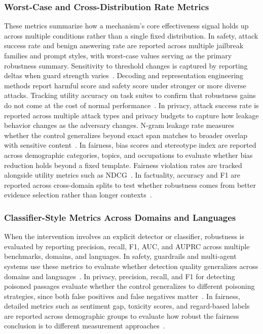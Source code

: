 \subsubsection{Worst-Case and Cross-Distribution Rate Metrics}
These metrics summarize how a mechanism's core effectiveness signal holds up across multiple conditions rather than a single fixed distribution. In safety, attack success rate and benign answering rate are reported across multiple jailbreak families and prompt styles, with worst-case values serving as the primary robustness summary. Sensitivity to threshold changes is captured by reporting deltas when guard strength varies~\citep{kumar2024certifying, cao2024defending, zhou2024defending}. Decoding and representation engineering methods report harmful score and safety score under stronger or more diverse attacks. Tracking utility accuracy on task suites to confirm that robustness gains do not come at the cost of normal performance~\citep{Xu2024SafeDecodingDA, Wang2024InferAligner, deng2025guard}. In privacy, attack success rate is reported across multiple attack types and privacy budgets to capture how leakage behavior changes as the adversary changes. N-gram leakage rate measures whether the control generalizes beyond exact span matches to broader overlap with sensitive content~\citep{tong2025inferdpt, chaudhari2024phantom}. In fairness, bias scores and stereotype index are reported across demographic categories, topics, and occupations to evaluate whether bias reduction holds beyond a fixed template. Fairness violation rates are tracked alongside utility metrics such as NDCG~\citep{kamruzzaman2024prompting, dwivedi2023breaking, huang2024bias}. In factuality, accuracy and F1 are reported across cross-domain splits to test whether robustness comes from better evidence selection rather than longer contexts~\citep{wan2024dell, dhuliawala2024chain, zhou2024metacognitive, asai2024self}.

\subsubsection{Classifier-Style Metrics Across Domains and Languages}
When the intervention involves an explicit detector or classifier, robustness is evaluated by reporting precision, recall, F1, AUC, and AUPRC across multiple benchmarks, domains, and languages. In safety, guardrails and multi-agent systems use these metrics to evaluate whether detection quality generalizes across domains and languages~\citep{Padhi2024GraniteG, Ghosh2024AEGISOA, asad2025reddebatesaferresponsesmultiagent}. In privacy, precision, recall, and F1 for detecting poisoned passages evaluate whether the control generalizes to different poisoning strategies, since both false positives and false negatives matter~\citep{zou2025poisonedrag, zhong2023poisoning}. In fairness, detailed metrics such as sentiment gap, toxicity scores, and regard-based labels are reported across demographic groups to evaluate how robust the fairness conclusion is to different measurement approaches~\citep{zayed2024fairness, dasu2025attention}.

